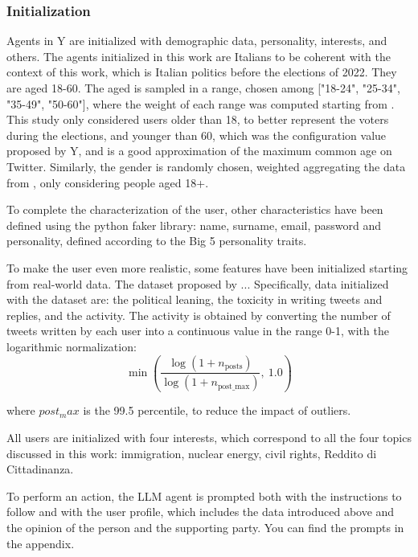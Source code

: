 \subsubsection{Initialization}
Agents in Y are initialized with demographic data, personality, interests, and others.
The agents initialized in this work are Italians to be coherent with the context of this work, which is Italian politics before the elections of 2022.
They are aged 18-60. The aged is sampled in a range, chosen among ["18-24", "25-34", "35-49", "50-60"], where the weight of each range was computed starting from \cite{statista2024twitter}. This study only considered users older than 18, to better represent the voters during the elections, and younger than 60, which was the configuration value proposed by Y, and is a good approximation of the maximum common age on Twitter.
Similarly, the gender is randomly chosen, weighted aggregating the data from \cite{statista2024twitter}, only considering people aged 18+.

To complete the characterization of the user, other characteristics have been defined using the python faker library: name, surname, email, password and personality, defined according to the Big 5 personality traits.

To make the user even more realistic, some features have been initialized starting from real-world data. The dataset proposed by \citet{pierri2023ita} ... %
Specifically, data initialized with the dataset are: the political leaning, the toxicity in writing tweets and replies, and the activity.
The activity is obtained by converting the number of tweets written by each user into a continuous value in the range 0-1, with the logarithmic normalization:
\[
\min\left( \frac{\log(1 + n_{\text{posts}})}{\log(1 + n_{\text{post\_max}})},\ 1.0 \right)
\]

where $post_max$ is the 99.5 percentile, to reduce the impact of outliers.

All users are initialized with four interests, which correspond to all the four topics discussed in this work: immigration, nuclear energy, civil rights, Reddito di Cittadinanza.

To perform an action, the LLM agent is prompted both with the instructions to follow and with the user profile, which includes the data introduced above and the opinion of the person and the supporting party.
You can find the prompts in the appendix.




